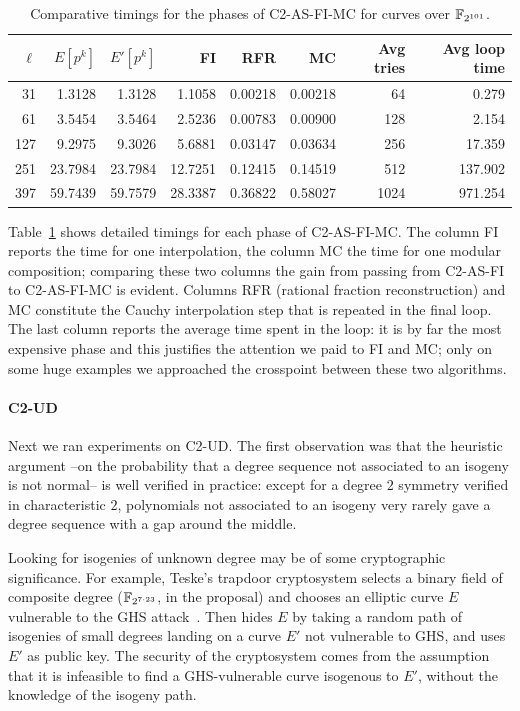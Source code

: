 \begin{table}
  \centering
  \begin{tabular}{r r r r r r r r}
    \hline
    $\ell$ & $E[p^k]$ & $E'[p^k]$ & FI & RFR & MC & Avg tries & Avg loop time\\
    \hline
    31 & 1.3128 & 1.3128 & 1.1058 & 0.00218 & 0.00218 & 64 & 0.279\\
    61 & 3.5454 & 3.5464 & 2.5236 & 0.00783 & 0.00900 & 128 & 2.154 \\
    127 & 9.2975 & 9.3026 & 5.6881 & 0.03147 & 0.03634 & 256 & 17.359 \\
    251	& 23.7984 & 23.7984 & 12.7251 & 0.12415 & 0.14519 & 512 & 137.902 \\
    397 & 59.7439 & 59.7579 & 28.3387 & 0.36822 & 0.58027 & 1024 & 971.254 \\
    \hline
  \end{tabular}
  \caption{Comparative timings for the phases of C2-AS-FI-MC for curves over $\mathbb{F}_{2^{101}}$.}
  \label{tab:C2}
\end{table}

Table~\ref{tab:C2} shows detailed timings for each phase of
C2-AS-FI-MC. The column FI reports the time for one interpolation, the
column MC the time for one modular composition; comparing these two
columns the gain from passing from C2-AS-FI to C2-AS-FI-MC is
evident. Columns RFR (rational fraction reconstruction) and MC
constitute the Cauchy interpolation step that is repeated in the final
loop. The last column reports the average time spent in the loop: it
is by far the most expensive phase and this justifies the attention we
paid to FI and MC; only on some huge examples we approached the
crosspoint between these two algorithms.


\paragraph{C2-UD}
\label{sec:c2-ud}
Next we ran experiments on C2-UD. The first observation was that the
heuristic argument --on the probability that a degree sequence not
associated to an isogeny is not normal-- is well verified in practice:
except for a degree $2$ symmetry verified in characteristic $2$,
polynomials not associated to an isogeny very rarely gave a degree
sequence with a gap around the middle.

Looking for isogenies of unknown degree may be of some cryptographic
significance. For example, Teske's trapdoor cryptosystem selects a
binary field of composite degree ($\mathbb{F}_{2^{7\cdot 23}}$, in the
proposal) and chooses an elliptic curve $E$ vulnerable to the GHS
attack~\cite{gaudry+hess+smart02}. Then hides $E$ by taking a random
path of isogenies of small degrees landing on a curve $E'$ not
vulnerable to GHS, and uses $E'$ as public key. The security of the
cryptosystem comes from the assumption that it is infeasible to find a
GHS-vulnerable curve isogenous to $E'$, without the knowledge of the
isogeny path. 

